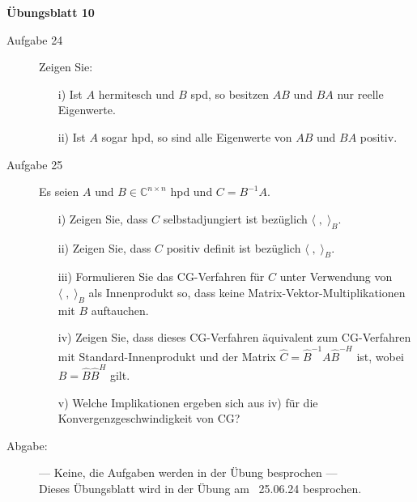 \documentclass[a4paper,11pt]{scrartcl}
\begin{document}
\aihead

\begin{center}
  {\large\textbf{Übungsblatt 10}}
\end{center}


\begin{description}
\item[Aufgabe 24]
Zeigen Sie:
\begin{itemize}
\item[i)] Ist $A$ hermitesch und $B$ spd, so besitzen $AB$ und $BA$ nur reelle Eigenwerte.
\item[ii)] Ist $A$ sogar hpd, so sind alle Eigenwerte von $AB$ und $BA$ positiv.
\end{itemize}
 \medskip
 
\item[Aufgabe 25]
Es seien $A$ und $B \in \mathbb{C}^{n\times n}$ hpd und $C = B^{-1}A$.
\begin{itemize}
\item [i)] Zeigen Sie, dass $C$ selbstadjungiert ist bezüglich $\langle \; , \; \rangle_B$. 
\item [ii)] Zeigen Sie, dass $C$ positiv definit ist bezüglich $\langle \; , \; \rangle_B$.
\item [iii)] Formulieren Sie das CG-Verfahren für $C$ unter Verwendung von $\langle \; , \; \rangle_B$ als Innenprodukt so, dass keine Matrix-Vektor-Multiplikationen mit $B$ auftauchen.
\item [iv)] Zeigen Sie, dass dieses CG-Verfahren äquivalent zum CG-Verfahren mit Standard-Innenprodukt und der Matrix $\hat{C} = \hat{B}^{-1} A \hat{B}^{-H}$ ist, wobei $B = \hat{B}\hat{B}^H$ gilt.
\item[v)] Welche Implikationen ergeben sich aus iv) für die Konvergenzgeschwindigkeit von CG?
\end{itemize}

\end{description}


\begin{description}
\item[Abgabe:] --- Keine, die Aufgaben werden in der Übung besprochen ---\\
Dieses Übungsblatt wird in der Übung am ~25.06.24 besprochen.



\end{description}
\end{document}
